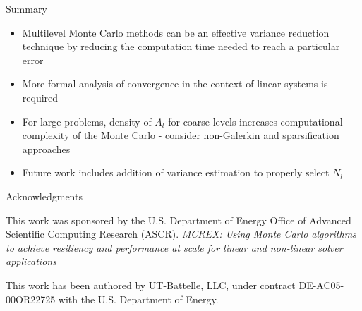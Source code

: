 \documentclass{beamer}
\begin{document}
\begin{frame}{Summary}

  \begin{itemize}
    \item Multilevel Monte Carlo methods can be an effective variance
      reduction technique by reducing the computation time needed to
      reach a particular error
      \medskip
    \item More formal analysis of convergence in the context of linear
      systems is required
      \medskip
    \item For large problems, density of $A_l$ for coarse levels
      increases computational complexity of the Monte Carlo - consider
      non-Galerkin and sparsification approaches
      \medskip
    \item Future work includes addition of variance estimation to
      properly select $N_l$
  \end{itemize}

\end{frame}

\begin{frame}{Acknowledgments}

  This work was sponsored by the U.S. Department of Energy Office of
  Advanced Scientific Computing Research (ASCR). \textit{MCREX: Using
    Monte Carlo algorithms to achieve resiliency and performance at
    scale for linear and non-linear solver applications}

  \bigskip
  \bigskip
  
  This work has been authored by UT-Battelle, LLC, under contract
  DE-AC05-00OR22725 with the U.S. Department of Energy.

\end{frame}

\end{document}
